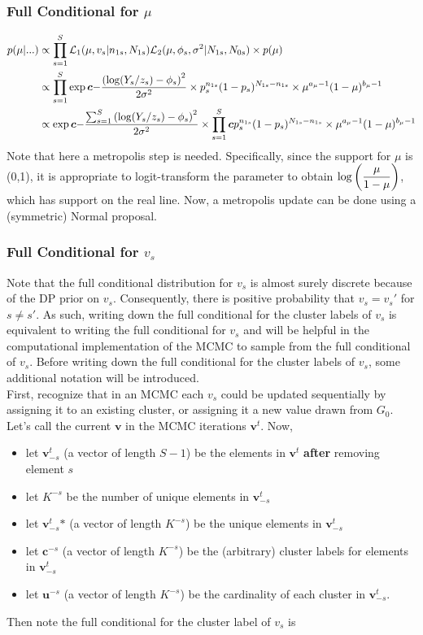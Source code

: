\documentclass[12pt]{article}
\newcommand{\bc}{\mbox{\boldmath $c$}}
\begin{document}
\subsubsection{Full Conditional for $\mu$}
\begin{align*}
  p(\mu|...) &\propto \prods \L_1(\mu,v_s|n_{1s},N_{1s})\L_2(\mu,\phi_s,\sigma^2|N_{1s},N_{0s}) \times p(\mu) \\
             &\propto \prods \exp\bc{-\frac{\p{\log(Y_s/z_s)-\phi_s}^2}{2\sigma^2}} \times p_s^{n_{1s}} (1-p_s)^{N_{1s}-n_{1s}} \times \mu^{a_\mu-1} (1-\mu)^{b_\mu-1}\\
             &\propto \exp\bc{-\frac{\sums\p{\log(Y_s/z_s)-\phi_s}^2}{2\sigma^2}} \times \prods\bc{p_s^{n_{1s}} (1-p_s)^{N_{1s}-n_{1s}}} \times \mu^{a_\mu-1} (1-\mu)^{b_\mu-1}\\
\end{align*}
Note that here a metropolis step is needed. Specifically, since the support for
$\mu$ is (0,1), it is appropriate to logit-transform the parameter to obtain
$\log\left(\displaystyle\frac{\mu}{1-\mu}\right)$, which has support on the real line. Now, a
metropolis update can be done using a (symmetric) Normal proposal.

\subsubsection{Full Conditional for $v_s$}
Note that the full conditional distribution for $v_s$ is almost surely discrete because of the DP prior on $v_s$. 
Consequently, there is positive probability that $v_s=v_s'$ for $s\ne s'$. As such, writing down the full conditional for
the cluster labels of $v_s$ is equivalent to writing the full conditional for $v_s$ and will be helpful in the computational
implementation of the MCMC to sample from the full conditional of $v_s$. Before writing down the full conditional for the
cluster labels of $v_s$, some additional notation will be introduced.\\

\noindent
First, recognize that in an MCMC each $v_s$ could be updated sequentially by assigning it to an existing cluster,
or assigning it a new value drawn from $G_0$. Let's call the current $\bm v$ in the MCMC iterations $\bm v^t$. Now,

\def\vt{\bm v^t}
\def\vstar{ \vt_{-s}\mbox{*} }

\begin{itemize}
  \item let $\vt_{-s}$ (a vector of length $S-1$) be the elements in $\vt$ \textbf{after} removing element $s$
  \item let $K^{-s}$ be the number of unique elements in $\vt_{-s}$ 
  \item let $\vstar$ (a vector of length $K^{-s}$) be the unique elements in $\vt_{-s}$
  \item let $\bm c^{-s}$ (a vector of length $K^{-s}$) be the (arbitrary) cluster labels for elements in $\vt_{-s}$
  \item let $\bm u^{-s}$ (a vector of length $K^{-s}$) be the cardinality of each cluster in $\vt_{-s}$.
\end{itemize}
Then note the full conditional for the cluster label of $v_s$ is 
\end{document}
